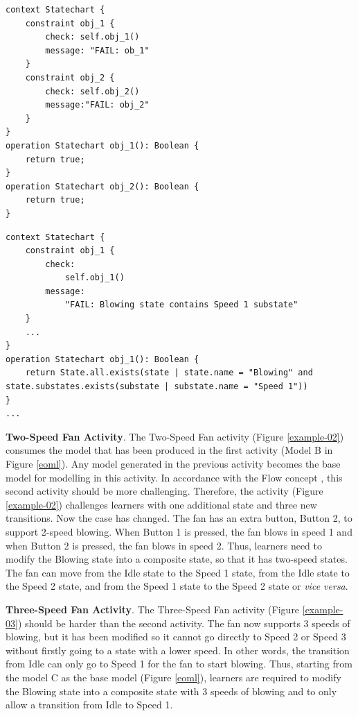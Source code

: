 \documentclass[12pt, a4paper]{report} \usepackage[titletoc]{appendix}
\begin{document}
\begin{lstlisting}[style=interfaces,caption={Validation template for objectives in One-Speed Fan activity/level.},label=validation-template]
context Statechart {
    constraint obj_1 {
        check: self.obj_1()
        message: "FAIL: ob_1"
    }
    constraint obj_2 {
        check: self.obj_2()
        message:"FAIL: obj_2"
    }        
}
operation Statechart obj_1(): Boolean {
    return true;
}
operation Statechart obj_2(): Boolean {
    return true;
}
\end{lstlisting} 


\begin{lstlisting}[style=interfaces,caption={Validation realisation for Objective 1 in One-Speed Fan activity/level.}, label=validation-realisation]
context Statechart {
    constraint obj_1 {
        check: 
            self.obj_1()
        message:
            "FAIL: Blowing state contains Speed 1 substate"
    }
    ...
}
operation Statechart obj_1(): Boolean {
    return State.all.exists(state | state.name = "Blowing" and state.substates.exists(substate | substate.name = "Speed 1"))
}
...
\end{lstlisting} 

\textbf{Two-Speed Fan Activity}. The Two-Speed Fan activity (Figure \ref{example-02}) consumes the model that has been produced in the first activity (Model B in Figure \ref{eoml}). Any model generated in the previous activity becomes the base model for modelling in this activity. In accordance with the Flow concept \cite{csikszentmihalyi2014toward}, this second activity should be more challenging. Therefore, the activity (Figure \ref{example-02}) challenges learners with one additional state and three new transitions. Now the case has changed. The fan has an extra button, Button 2, to support 2-speed blowing. When Button 1 is pressed, the fan blows in speed 1 and when Button 2 is pressed, the fan blows in speed 2. Thus, learners need to modify the Blowing state into a composite state, so that it has two-speed states. The fan can move from the Idle state to the Speed 1 state, from the Idle state to the Speed 2 state, and from the Speed 1 state to the Speed 2 state or \textit{vice versa}.

\textbf{Three-Speed Fan Activity}. The Three-Speed Fan activity (Figure \ref{example-03}) should be harder than the second activity. The fan now supports 3 speeds of blowing, but it has been modified so it cannot go directly to Speed 2 or Speed 3 without firstly going to a state with a lower speed. In other words, the transition from Idle can only go to Speed 1 for the fan to start blowing. Thus, starting from the model C as the base model (Figure \ref{eoml}), learners are required to modify the Blowing state into a composite state with 3 speeds of blowing and to only allow a transition from Idle to Speed 1.
\end{document}
